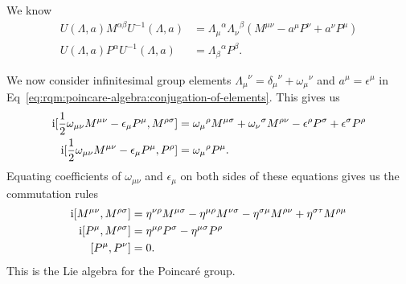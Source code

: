 \M
We know
\begin{subequations}\label{eq:rqm:poincare-algebra:conjugation-of-elements}
\begin{align}
U(\Lambda,a)M^{\alpha\beta}U^{-1}(\Lambda,a) 
&= {\Lambda_{\mu}}^{\alpha}{\Lambda_{\nu}}^{\beta}(M^{\mu\nu} - a^{\mu}P^{\nu} + a^{\nu}P^{\mu})\\
U(\Lambda,a)P^{\alpha}U^{-1}(\Lambda,a) &= {\Lambda_{\beta}}^{\alpha}P^{\beta}.
\end{align}
\end{subequations}

We now consider infinitesimal group elements
${\Lambda_{\mu}}^{\nu}={\delta_{\mu}}^{\nu}+{\omega_{\mu}}^{\nu}$ and
$a^{\mu}=\epsilon^{\mu}$ in Eq~\eqref{eq:rqm:poincare-algebra:conjugation-of-elements}.
This gives us
\begin{subequations}
\begin{align}
\mathrm{i}[\frac{1}{2}\omega_{\mu\nu}M^{\mu\nu}-\epsilon_{\mu}P^{\mu},M^{\rho\sigma}]
&={\omega_{\mu}}^{\rho}M^{\mu\sigma} + {\omega_{\nu}}^{\sigma}M^{\rho\nu}
-\epsilon^{\rho}P^{\sigma} + \epsilon^{\sigma}P^{\rho}\\
\mathrm{i}[\frac{1}{2}\omega_{\mu\nu}M^{\mu\nu}-\epsilon_{\mu}P^{\mu},P^{\rho}]
&={\omega_{\mu}}^{\rho}P^{\mu}.
\end{align}
\end{subequations}
Equating coefficients of $\omega_{\mu\nu}$ and $\epsilon_{\mu}$ on both
sides of these equations gives us the commutation rules
\begin{subequations}
\begin{align}
\mathrm{i}[M^{\mu\nu},M^{\rho\sigma}] &= \eta^{\nu\rho}M^{\mu\sigma}
- \eta^{\mu\rho}M^{\nu\sigma} - \eta^{\sigma\mu}M^{\rho\nu} + \eta^{\sigma\tau}M^{\rho\mu}\\
\mathrm{i}[P^{\mu},M^{\rho\sigma}] &= \eta^{\mu\rho}P^{\sigma} - \eta^{\mu\sigma}P^{\rho}\\
[P^{\mu},P^{\nu}] &= 0.
\end{align}
\end{subequations}
This is the Lie algebra for the Poincar\'e group.

